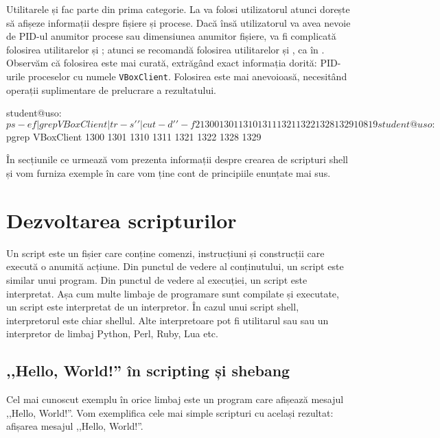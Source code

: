 Utilitarele  și  fac parte din prima categorie.
La va folosi utilizatorul atunci dorește să afișeze informații despre fișiere și procese.
Dacă însă utilizatorul va avea nevoie de PID-ul anumitor procese sau dimensiunea anumitor fișiere, va fi complicată folosirea utilitarelor  și ; atunci se recomandă folosirea utilitarelor  și , ca în .
Observăm că folosirea  este mai curată, extrăgând exact informația dorită: PID-urile proceselor cu numele \texttt{VBoxClient}.
Folosirea  este mai anevoioasă, necesitând operații suplimentare de prelucrare a rezultatului.

\begin{screen}[caption={Utiltare pentru afișare și pentru prelucrare},label={lst:auto:print-vs-process-cmd}]
student@uso:~$ ps -ef | grep VBoxClient | tr -s ' ' | cut -d ' ' -f 2
1300
1301
1310
1311
1321
1322
1328
1329
10819
student@uso:~$ pgrep VBoxClient
1300
1301
1310
1311
1321
1322
1328
1329
\end{screen}

În secțiunile ce urmează vom prezenta informații despre crearea de scripturi shell și vom furniza exemple în care vom ține cont de principiile enunțate mai sus.

\section{Dezvoltarea scripturilor}
\label{sec:auto:dev}

Un script este un fișier care conține comenzi, instrucțiuni și construcții care execută o anumită acțiune.
Din punctul de vedere al conținutului, un script este similar unui program.
Din punctul de vedere al execuției, un script este interpretat.
Așa cum multe limbaje de programare sunt compilate și executate, un script este interpretat de un interpretor.
În cazul unui script shell, interpretorul este chiar shellul.
Alte interpretoare pot fi utilitarul  sau  sau un interpretor de limbaj Python, Perl, Ruby, Lua etc.

\subsection{,,Hello, World!'' în scripting și shebang}
\label{sec:auto:dev:hello}

Cel mai cunoscut exemplu în orice limbaj este un program care afișează mesajul ,,Hello, World!''.
Vom exemplifica cele mai simple scripturi cu același rezultat: afișarea mesajul ,,Hello, World!''.

